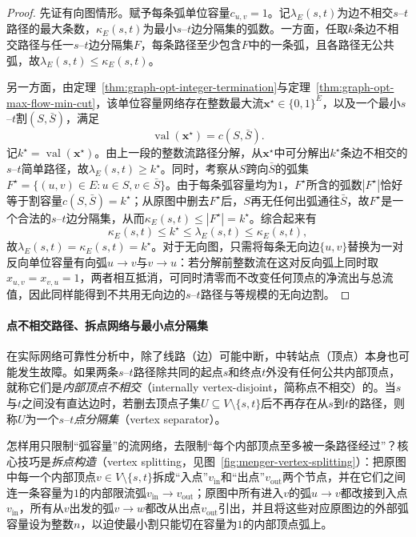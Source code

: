 \begin{proof}
先证有向图情形。赋予每条弧单位容量$c_{u,v}=1$。记$\lambda_E(s,t)$为边不相交$s$--$t$路径的最大条数，$\kappa_E(s,t)$为最小$s$--$t$边分隔集的弧数。一方面，任取$k$条边不相交路径与任一$s$--$t$边分隔集$F$，每条路径至少包含$F$中的一条弧，且各路径无公共弧，故$\lambda_E(s,t)\leq\kappa_E(s,t)$。

另一方面，由定理~\ref{thm:graph-opt-integer-termination}与定理~\ref{thm:graph-opt-max-flow-min-cut}，该单位容量网络存在整数最大流$\bm x^\star\in\{0,1\}^E$，以及一个最小$s$--$t$割$(S,\bar S)$，满足
\[
  \operatorname{val}(\bm x^\star) = c(S,\bar S).
\]
记$k^\star=\operatorname{val}(\bm x^\star)$。由上一段的整数流路径分解，从$\bm x^\star$中可分解出$k^\star$条边不相交的$s$--$t$简单路径，故$\lambda_E(s,t)\geq k^\star$。同时，考察从$S$跨向$\bar S$的弧集$F^\star=\{(u,v)\in E:u\in S,v\in\bar S\}$。由于每条弧容量均为$1$，$F^\star$所含的弧数$|F^\star|$恰好等于割容量$c(S,\bar S)=k^\star$；从原图中删去$F^\star$后，$S$再无任何出弧通往$\bar S$，故$F^\star$是一个合法的$s$--$t$边分隔集，从而$\kappa_E(s,t)\leq |F^\star|=k^\star$。综合起来有
\[
  \kappa_E(s,t) \leq k^\star \leq \lambda_E(s,t) \leq \kappa_E(s,t),
\]
故$\lambda_E(s,t)=\kappa_E(s,t)=k^\star$。对于无向图，只需将每条无向边$\{u,v\}$替换为一对反向单位容量有向弧$u\to v$与$v\to u$：若分解前整数流在这对反向弧上同时取$x_{u,v}=x_{v,u}=1$，两者相互抵消，可同时清零而不改变任何顶点的净流出与总流值，因此同样能得到不共用无向边的$s$--$t$路径与等规模的无向边割。
\end{proof}

\paragraph{点不相交路径、拆点网络与最小点分隔集}
在实际网络可靠性分析中，除了线路（边）可能中断，中转站点（顶点）本身也可能发生故障。如果两条$s$--$t$路径除共同的起点$s$和终点$t$外没有任何公共内部顶点，就称它们是\emph{内部顶点不相交}（internally vertex-disjoint，简称点不相交）的。当$s$与$t$之间没有直达边时，若删去顶点子集$U\subseteq V\setminus\{s,t\}$后不再存在从$s$到$t$的路径，则称$U$为一个$s$--$t$\emph{点分隔集}（vertex separator）。

怎样用只限制“弧容量”的流网络，去限制“每个内部顶点至多被一条路径经过”？核心技巧是\emph{拆点构造}（vertex splitting，见图~\ref{fig:menger-vertex-splitting}）：把原图中每一个内部顶点$v\in V\setminus\{s,t\}$拆成“入点”$v_{\mathrm{in}}$和“出点”$v_{\mathrm{out}}$两个节点，并在它们之间连一条容量为$1$的内部限流弧$v_{\mathrm{in}}\to v_{\mathrm{out}}$；原图中所有进入$v$的弧$u\to v$都改接到入点$v_{\mathrm{in}}$，所有从$v$出发的弧$v\to w$都改从出点$v_{\mathrm{out}}$引出，并且将这些对应原图边的外部弧容量设为整数$n$，以迫使最小割只能切在容量为$1$的内部顶点弧上。


